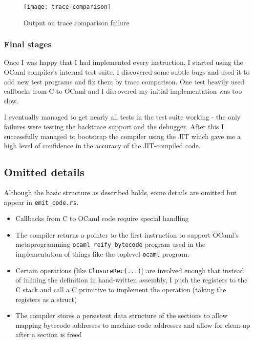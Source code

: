 \begin{figure}[h]
      \texttt{[image: trace-comparison]}
      \caption{Output on trace comparison failure}
      \label{fig:trace-comparison}
\end{figure}

\subsubsection{Final stages}

Once I was happy that I had implemented every instruction, I started using
the OCaml compiler's internal test suite. I discovered some subtle bugs and used it to add new test
programs and fix them by trace comparison. One test heavily used callbacks from C to OCaml and I
discovered my initial implementation was too slow.

I eventually managed to get nearly all tests in the test suite working - the only failures were
testing the backtrace support and the debugger.  After this I successfully managed to bootstrap the
compiler using the JIT which gave me a high level of confidence in the accuracy of the JIT-compiled
code.

\subsection{Omitted details}

Although the basic structure as described holds, some details are omitted but appear in
\texttt{emit\_code.rs}.

\begin{itemize}
      \item Callbacks from C to OCaml code require special handling
      \item The compiler returns a pointer to the first instruction to support OCaml's
            metaprogramming \texttt{ocaml\_reify\_bytecode} program used in the implementation of
            things like the
            toplevel \texttt{ocaml} program.
      \item Certain operations (like \texttt{ClosureRec(...)}) are involved enough that instead of
            inlining the definition in
            hand-written assembly, I push the registers to the C stack and call a C primitive to
            implement the
            operation (taking the registers as a struct)
      \item The compiler stores a persistent data structure of the sections to allow mapping
            bytecode addresses to machine-code addresses and allow for clean-up after a section is
            freed
\end{itemize}

